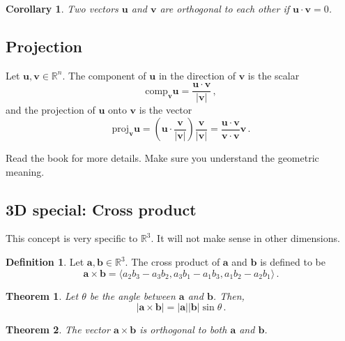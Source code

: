 \documentclass[
]{book}
\newtheorem{theorem}{Theorem}[chapter]
\newtheorem{corollary}{Corollary}[chapter]
\theoremstyle{definition}
\newtheorem{definition}{Definition}[chapter]
\theoremstyle{definition}
\theoremstyle{definition}
\theoremstyle{definition}
\theoremstyle{remark}
\begin{document}
\begin{corollary}
Two vectors \(\textbf{u}\) and \(\textbf{v}\) are orthogonal to each other
if \(\textbf{u} \cdot \textbf{v} = 0\).
\end{corollary}

\hypertarget{projection}{%
\subsection*{Projection}\label{projection}}

Let \(\textbf{u}, \textbf{v}\in \mathbb{R}^n\). The component of \(\textbf{u}\)
in the direction of \(\textbf{v}\) is the scalar
\begin{equation*}
\mathrm{comp}_{\mathbf{v}}\mathbf{u} = \frac{\mathbf{u}\cdot \mathbf{v}}{|\mathbf{v}|} \,,
\end{equation*}
and the projection of \(\mathbf{u}\) onto \(\mathbf{v}\) is the vector
\begin{equation*}
    \mathrm{proj}_{\mathbf{v}}\mathbf{u} 
    =\left( \mathbf{u}\cdot \frac{\mathbf{v}}{|\mathbf{v}|}\right) \frac{\mathbf{v}}{|\mathbf{v}|} 
    = \frac{\mathbf{u}\cdot \mathbf{v}}{\mathbf{v} \cdot\mathbf{v}} \mathbf{v} \,.
\end{equation*}

Read the book for more details.
Make sure you understand the geometric meaning.

\hypertarget{d-special-cross-product}{%
\subsection{3D special: Cross product}\label{d-special-cross-product}}

This concept is very specific to \(\mathbb{R}^3\).
It will not make sense in other dimensions.

\begin{definition}
Let \(\mathbf{a}, \mathbf{b} \in \mathbb{R}^3\).
The cross product of \(\mathbf{a}\) and \(\mathbf{b}\) is defined to be
\begin{equation*}
    \mathbf{a} \times \mathbf{b} = \langle a_2 b_3 - a_3 b_2, a_3b_1 - a_1 b_3, a_1b_2 - a_2b_1 \rangle \,.
\end{equation*}
\end{definition}

\begin{theorem}
Let \(\theta\) be the angle between \(\mathbf{a}\) and \(\mathbf{b}\). Then,
\begin{equation*}
    | \mathbf{a} \times \mathbf{b} | = |\mathbf{a}||\mathbf{b}| \sin\theta \,.
\end{equation*}
\end{theorem}

\begin{theorem}
The vector \(\mathbf{a}\times \mathbf{b}\) is orthogonal to both \(\mathbf{a}\) and \(\mathbf{b}\).
\end{theorem}
\end{document}
